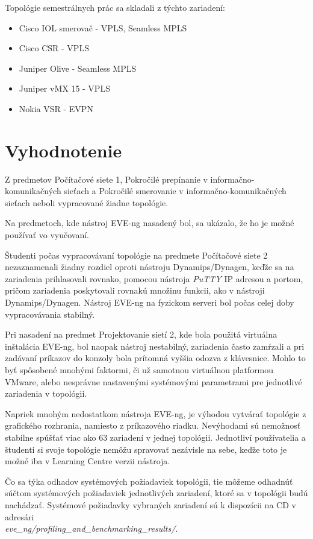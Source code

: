 Topológie semestrálnych prác sa skladali z týchto zariadení:

\begin{itemize}[noitemsep]
    \item Cisco IOL smerovač - VPLS, Seamless MPLS
    \item Cisco CSR - VPLS
    \item Juniper Olive - Seamless MPLS
    \item Juniper vMX 15 - VPLS
    \item Nokia VSR - EVPN
\end{itemize}





\section{Vyhodnotenie}

Z predmetov Počítačové siete 1, Pokročilé prepínanie v informačno-komunikačných sieťach a Pokročilé smerovanie v informačno-komunikačných sieťach neboli vypracované žiadne topológie.

Na predmetoch, kde nástroj EVE-ng nasadený bol, sa ukázalo, že ho je možné používať vo vyučovaní.

Študenti počas vypracovávaní topológie na predmete Počítačové siete 2 nezaznamenali žiadny rozdiel oproti nástroju Dynamips/Dynagen, keďže sa na zariadenia prihlasovali rovnako, pomocou nástroja \emph{PuTTY} IP adresou a portom, pričom zariadenia poskytovali rovnakú množinu funkcii, ako v nástroji Dynamips/Dynagen. Nástroj EVE-ng na fyzickom serveri bol počas celej doby vypracovávania stabilný.

Pri nasadení na predmet Projektovanie sietí 2, kde bola použitá virtuálna inštalácia EVE-ng, bol naopak nástroj nestabilný, zariadenia často zamŕzali a pri zadávaní príkazov do konzoly bola prítomná vyššia odozva z klávesnice. Mohlo to byť spôsobené mnohými faktormi, či už samotnou virtuálnou platformou VMware, alebo nesprávne nastavenými systémovými parametrami pre jednotlivé zariadenia v topológii.

Napriek mnohým nedostatkom nástroja EVE-ng, je výhodou vytvárať topológie z grafického rozhrania, namiesto z príkazového riadku. Nevýhodami sú nemožnosť stabilne spúšťať viac ako 63 zariadení v jednej topológii. Jednotliví používatelia a študenti si svoje topológie nemôžu spravovať nezávisle na sebe, keďže toto je možné iba v Learning Centre verzii nástroja.

Čo sa týka odhadov systémových požiadaviek topológii, tie môžeme odhadnúť súčtom systémových požiadaviek jednotlivých zariadení, ktoré sa v topológii budú nachádzať. Systémové požiadavky vybraných zariadení sú k dispozícii na CD v adresári \\ \emph{eve\_ng/profiling\_and\_benchmarking\_results/}.